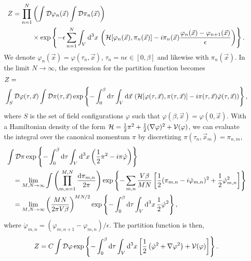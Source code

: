 %
\begin{align}
    \nonumber
    Z = 
    \prod_{n=1}^N  
    &
    \left(
        \int \mathcal D \varphi_n (\vec x) \int \mathcal D \pi_n(\vec x)
    \right)
    \\ &
    \times \text{exp} \left\{ -\epsilon \sum_{n=1}^N \int_V \text{d}^3x \,
    \left(
        \mathcal{H}[\varphi_n(\vec x), \pi_n(\vec x)] - i \pi_n(\vec x) \frac{\varphi_n(\vec x) - \varphi_{n+1}(\vec x)}{\epsilon}
    \right)
     \right\}.
\end{align}
%
We denote $\varphi_n(\vec x) = \varphi(\tau_n, \vec x) $, $\tau_n = n \epsilon \in [0, \beta]$ and likewise with $\pi_n(\vec x)$. 
In the limit $N \rightarrow \infty$, the expression for the partition function becomes
%
\begin{align}
    \label{Thermal partition function}
    \nonumber
    & Z =
    \\ & 
    \int_S \mathcal D \varphi(\tau, \vec x) \int \mathcal D \pi(\tau, \vec x) \,
    \text{exp} \left\{ 
        - \int_0^\beta \text{d} \tau \int_V \text{d} \vec x \, 
        \left(
            \mathcal{H}[\varphi(\tau, \vec x), \pi(\tau, \vec x)]
            - i \pi(\tau, \vec x) \dot \varphi(\tau, \vec x)
        \right)
         \right\},
\end{align}
%
where $S$ is the set of field configurations $\varphi$ such that $\varphi(\beta, \vec x) = \varphi(0, \vec x)$.
With a Hamiltonian density of the form $\mathcal{H} = \frac{1}{2} \pi^2 + \frac{1}{2} (\nabla \varphi)^2 + \mathcal{V}(\varphi)$, we can evaluate the integral over the canonical momentum $\pi$ by discretizing $\pi(\tau_n, \vec x_m) = \pi_{n,m}$,
%
\begin{align*}
    & \int \mathcal D \pi\, \text{exp} \left\{ -  \int_0^\beta\text{d} \tau \int_V \text{d}^3x 
    \left(
        \frac{1}{2} \pi^2 - i \pi \dot \varphi 
    \right) \right\} 
    \\ &\quad 
    = \lim_{M,N \rightarrow \infty} \int \left(\prod_{m, n = 1}^{M, N} \frac{\text{d} \pi_{m, n}}{2 \pi}\right)
    \text{exp} \left\{ 
        - \sum_{m, n} \frac{V\beta}{MN}
        \left[
            \frac{1}{2}  (\pi_{m, n} - i \dot \varphi_{m, n})^2
            + \frac{1}{2} \dot \varphi_{m, n}^2
        \right]
     \right\} 
    \\ &\quad 
    = \lim_{M,N \rightarrow \infty} \left( \frac{M N }{2 \pi V \beta} \right)^{MN/2}
    \text{exp} \left\{ - \int_0^\beta\text{d} \tau \int_V \text{d}^3x \, \frac{1}{2}\dot \varphi^2 \right\},
\end{align*}
%
where $\dot \varphi_{m, n} = (\varphi_{m, n+1} - \varphi_{m, n})/\epsilon$.
The partition function is then, 
%
\begin{equation}
    Z = C \int \mathcal D \varphi\,
    \text{exp} \left\{ 
        - \int_0^\beta \text{d} \tau \int_V \text{d}^3 x
        \left[
            \frac{1}{2} \left(\dot \varphi^2 + \nabla \varphi^2\right) 
            + \mathcal{V}(\varphi)
        \right]
     \right\}.
\end{equation}
